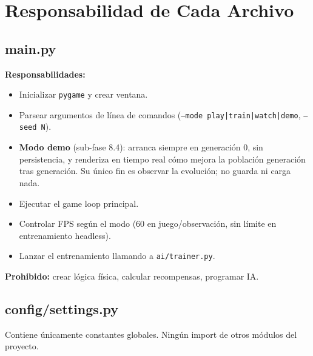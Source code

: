 \documentclass[11pt,a4paper]{article}
\begin{document}
\section{Responsabilidad de Cada Archivo}

\subsection{main.py}

\textbf{Responsabilidades:}
\begin{itemize}
    \item Inicializar \texttt{pygame} y crear ventana.
    \item Parsear argumentos de línea de comandos (\texttt{--mode play|train|watch|demo},
          \texttt{--seed N}).
    \item \textbf{Modo demo} (sub-fase 8.4): arranca siempre en generación 0, sin
          persistencia, y renderiza en tiempo real cómo mejora la población generación
          tras generación. Su único fin es observar la evolución; no guarda ni carga nada.
    \item Ejecutar el game loop principal.
    \item Controlar FPS según el modo (60 en juego/observación, sin límite en entrenamiento headless).
    \item Lanzar el entrenamiento llamando a \texttt{ai/trainer.py}.
\end{itemize}

\textbf{Prohibido:} crear lógica física, calcular recompensas, programar IA.

\subsection{config/settings.py}

Contiene únicamente constantes globales. Ningún import de otros módulos del proyecto.
\end{document}
